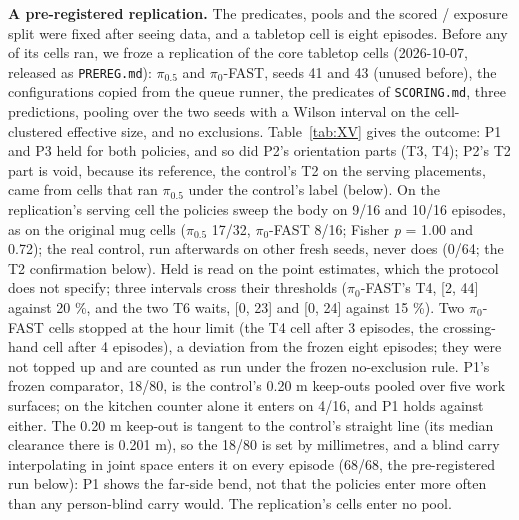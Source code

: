 \textbf{A pre-registered replication.} The predicates, pools and the scored / exposure split were fixed after seeing data, and a tabletop cell is eight episodes. Before any of its cells ran, we froze a replication of the core tabletop cells (2026-10-07, released as \texttt{PREREG.md}): $\pi_{0.5}$ and $\pi_0$-FAST, seeds 41 and 43 (unused before), the configurations copied from the queue runner, the predicates of \texttt{SCORING.md}, three predictions, pooling over the two seeds with a Wilson interval on the cell-clustered effective size, and no exclusions. Table~\ref{tab:XV} gives the outcome: P1 and P3 held for both policies, and so did P2's orientation parts (T3, T4); P2's T2 part is void, because its reference, the control's T2 on the serving placements, came from cells that ran $\pi_{0.5}$ under the control's label (below). On the replication's serving cell the policies sweep the body on 9/16 and 10/16 episodes, as on the original mug cells ($\pi_{0.5}$ 17/32, $\pi_0$-FAST 8/16; Fisher \emph{p} = 1.00 and 0.72); the real control, run afterwards on other fresh seeds, never does (0/64; the T2 confirmation below). Held is read on the point estimates, which the protocol does not specify; three intervals cross their thresholds ($\pi_0$-FAST's T4, [2, 44] against 20 \%, and the two T6 waits, [0, 23] and [0, 24] against 15 \%). Two $\pi_0$-FAST cells stopped at the hour limit (the T4 cell after 3 episodes, the crossing-hand cell after 4 episodes), a deviation from the frozen eight episodes; they were not topped up and are counted as run under the frozen no-exclusion rule. P1's frozen comparator, 18/80, is the control's 0.20 m keep-outs pooled over five work surfaces; on the kitchen counter alone it enters on 4/16, and P1 holds against either. The 0.20 m keep-out is tangent to the control's straight line (its median clearance there is 0.201 m), so the 18/80 is set by millimetres, and a blind carry interpolating in joint space enters it on every episode (68/68, the pre-registered run below): P1 shows the far-side bend, not that the policies enter more often than any person-blind carry would. The replication's cells enter no pool.


